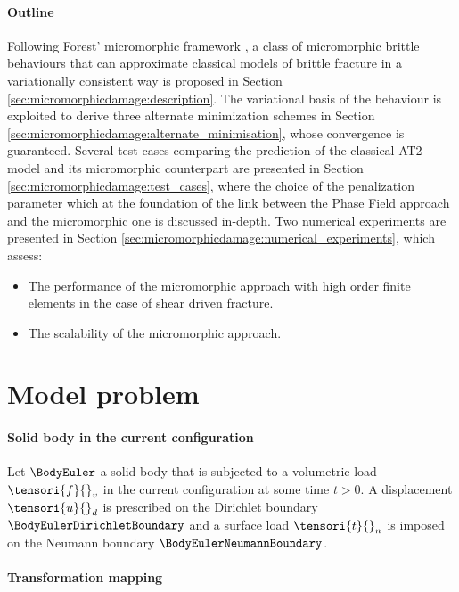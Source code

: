 \paragraph{Outline}

Following Forest' micromorphic framework
\cite{forest_micromorphic_2009, forest_nonlinear_2016}, a class of micromorphic
brittle behaviours that can approximate classical models of brittle
fracture in a variationally consistent way is proposed in
Section \ref{sec:micromorphicdamage:description}.
The variational basis of the behaviour is exploited to derive three alternate
minimization schemes in Section
\ref{sec:micromorphicdamage:alternate_minimisation}, whose convergence is guaranteed.
%
%
%
Several test cases comparing the prediction of the classical AT2 model
and its micromorphic counterpart are presented in Section
\ref{sec:micromorphicdamage:test_cases}, where
the choice of the penalization
parameter which at the foundation of the link between the Phase Field approach and the 
micromorphic one is discussed in-depth.
%
%
%
Two numerical experiments are presented in Section
\ref{sec:micromorphicdamage:numerical_experiments}, which assess:
%
%
%
\begin{itemize}
    \item The performance of the micromorphic approach with high order finite
    elements in the case of shear driven fracture.
    \item The scalability of the micromorphic approach.
\end{itemize}

\section{Model problem}

\paragraph{Solid body in the current configuration}

Let $\BodyEuler$ a solid body that is subjected to a volumetric load $\tensori{f}{}_v$ in the current configuration at some time $t > 0$.
A displacement $\tensori{u}{}_{d}$ is prescribed
on the Dirichlet boundary $\BodyEulerDirichletBoundary$ and a surface load $\tensori{t}{}_{n}$ is imposed
on the Neumann boundary $\BodyEulerNeumannBoundary$.

\paragraph{Transformation mapping}

